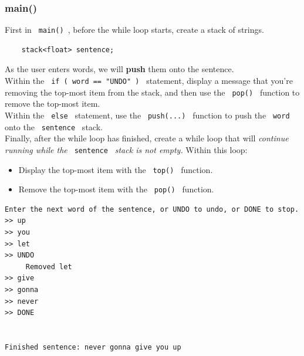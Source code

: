 \documentclass[a4paper,12pt]{book}
\begin{document}
            
                \hrulefill{}
                \subsubsection*{ main() }

                    First in \texttt{ main() }, before the while loop starts,
                    create a stack of strings.
                    
\begin{verbatim}
    stack<float> sentence;
\end{verbatim}

                    As the user enters words, we will \textbf{ push } them
                    onto the sentence. \\

                    Within the \texttt{ if ( word == "UNDO" ) } statement,
                    display a message that you're removing the top-most item
                    from the stack, and then use the \texttt{ pop() } function
                    to remove the top-most item. \\

                    Within the \texttt{ else } statement,
                    use the \texttt{ push(...) } function to push the
                    \texttt{ word } onto the \texttt{ sentence } stack. \\

                    Finally, after the while loop has finished, create
                    a while loop that will \textit{ continue running while
                    the } \texttt{ sentence } \textit { stack is not empty. }
                    Within this loop:

                    \begin{itemize}
                        \item Display the top-most item with the \texttt{ top() } function.
                        \item Remove the top-most item with the \texttt{ pop() } function.
                    \end{itemize}

\begin{lstlisting}[style=output]
Enter the next word of the sentence, or UNDO to undo, or DONE to stop.
>> up
>> you
>> let
>> UNDO
	 Removed let
>> give
>> gonna
>> never
>> DONE


Finished sentence: never gonna give you up 
\end{lstlisting}
\end{document}
